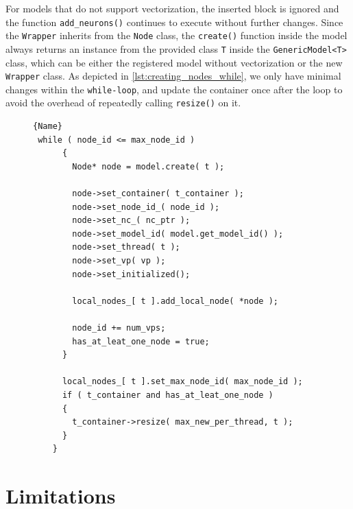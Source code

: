 For models that do not support vectorization, the inserted block is ignored and the function \texttt{add\_neurons()}  continues to execute without further changes. Since the \texttt{Wrapper} inherits from the \texttt{Node} class, the \texttt{create()} function inside the model always returns an instance from the provided class \texttt{T} inside the \texttt{GenericModel<T>} class, which can be either the registered model without vectorization or the new \texttt{Wrapper} class. As depicted in \autoref{lst:creating_nodes_while}, we only have minimal changes within the \texttt{while-loop}, and update the container once after the loop to avoid the overhead of repeatedly calling \texttt{resize()} on it.\\

\begin{figure}
\begin{lstlisting}[caption=Creating nodes,frame=tlrb, label=lst:creating_nodes_while]{Name}
 while ( node_id <= max_node_id )
      {
        Node* node = model.create( t );

        node->set_container( t_container );
        node->set_node_id_( node_id );
        node->set_nc_( nc_ptr );
        node->set_model_id( model.get_model_id() );
        node->set_thread( t );
        node->set_vp( vp );
        node->set_initialized();

        local_nodes_[ t ].add_local_node( *node );

        node_id += num_vps;
        has_at_leat_one_node = true;
      }

      local_nodes_[ t ].set_max_node_id( max_node_id );
      if ( t_container and has_at_leat_one_node )
      {
        t_container->resize( max_new_per_thread, t );
      }
    }
\end{lstlisting}
\end{figure}

\section{Limitations}

